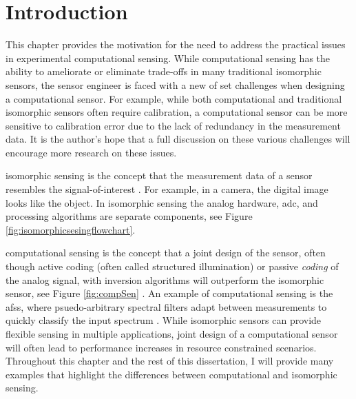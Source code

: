\chapter{Introduction}\label{chap:Introduction}


This chapter provides the motivation for the need to address the practical issues in experimental computational sensing. While computational sensing has the ability to ameliorate or eliminate trade-offs in many traditional isomorphic sensors, the sensor engineer is faced with a new of set challenges when designing a computational sensor. For example, while both computational and traditional isomorphic sensors often require calibration, a computational sensor can be more sensitive to calibration error due to the lack of redundancy in the measurement data. It is the author's hope that a full discussion on these various challenges will encourage more research on these issues. 

\Gls{isomorphic sensing} is the concept that the measurement data of a sensor resembles the signal-of-interest \cite{brady2009optical}. For example, in a camera, the digital image looks like the object. In isomorphic sensing the analog hardware, \acrfull{adc}, and processing algorithms are separate components, see Figure \ref{fig:isomorphicsesingflowchart}.  

\Gls{computational sensing} is the concept that a joint design of the sensor, often though active \gls{coding} (often called structured illumination) or passive \emph{coding} of the analog signal, with inversion algorithms will outperform the isomorphic sensor, see Figure \ref{fig:compSen} \cite{neifeld2006taskSpecificSensing}. An example of computational sensing is the \acrfull{afss}, where psuedo-arbitrary spectral filters adapt between measurements to quickly classify the input spectrum \cite{dinakarababu2011adaptive}. While \gls{isomorphic} sensors can provide flexible sensing in multiple applications, joint design of a \gls{computational sensor} will often lead to performance increases in resource constrained scenarios. Throughout this chapter and the rest of this dissertation, I will provide many examples that highlight the differences between computational and isomorphic sensing. 



